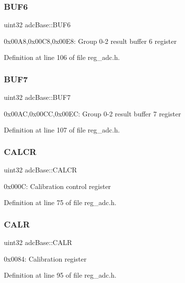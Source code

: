 \subsubsection{\texorpdfstring{B\+U\+F6}{BUF6}}
{\footnotesize\ttfamily uint32 adc\+Base\+::\+B\+U\+F6}

0x00\+A8,0x00\+C8,0x00\+E8\+: Group 0-\/2 result buffer 6 register 

Definition at line 106 of file reg\+\_\+adc.\+h.

\mbox{\label{structadcBase_a36ab18ace961a0dbb00a2654180c5701}} 
\subsubsection{\texorpdfstring{B\+U\+F7}{BUF7}}
{\footnotesize\ttfamily uint32 adc\+Base\+::\+B\+U\+F7}

0x00\+AC,0x00\+CC,0x00\+EC\+: Group 0-\/2 result buffer 7 register 

Definition at line 107 of file reg\+\_\+adc.\+h.

\mbox{\label{structadcBase_a5a3b306cbec35ea66b0cfe5310d943a5}} 
\subsubsection{\texorpdfstring{C\+A\+L\+CR}{CALCR}}
{\footnotesize\ttfamily uint32 adc\+Base\+::\+C\+A\+L\+CR}

0x000C\+: Calibration control register 

Definition at line 75 of file reg\+\_\+adc.\+h.

\mbox{\label{structadcBase_aee3b42bbd787ba364bfa0d916895f16c}} 
\subsubsection{\texorpdfstring{C\+A\+LR}{CALR}}
{\footnotesize\ttfamily uint32 adc\+Base\+::\+C\+A\+LR}

0x0084\+: Calibration register 

Definition at line 95 of file reg\+\_\+adc.\+h.

